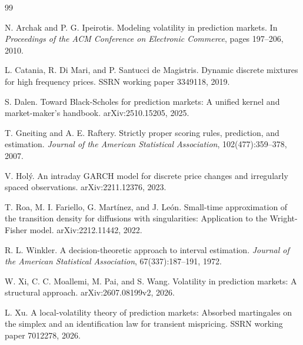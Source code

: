 \documentclass[11pt]{article}
\newcommand{\1}{\mathbb I}
\begin{document}
\begin{thebibliography}{99}

N. Archak and P. G. Ipeirotis.
Modeling volatility in prediction markets.
In \emph{Proceedings of the ACM Conference on Electronic Commerce}, pages 197--206, 2010.

L. Catania, R. Di Mari, and P. Santucci de Magistris.
Dynamic discrete mixtures for high frequency prices.
SSRN working paper 3349118, 2019.

S. Dalen.
Toward Black-Scholes for prediction markets: A unified kernel and market-maker's handbook.
arXiv:2510.15205, 2025.

T. Gneiting and A. E. Raftery.
Strictly proper scoring rules, prediction, and estimation.
\emph{Journal of the American Statistical Association}, 102(477):359--378, 2007.

V. Hol\'y.
An intraday GARCH model for discrete price changes and irregularly spaced observations.
arXiv:2211.12376, 2023.

T. Roa, M. I. Fariello, G. Mart\'inez, and J. Le\'on.
Small-time approximation of the transition density for diffusions with singularities: Application to the Wright-Fisher model.
arXiv:2212.11442, 2022.

R. L. Winkler.
A decision-theoretic approach to interval estimation.
\emph{Journal of the American Statistical Association}, 67(337):187--191, 1972.

W. Xi, C. C. Moallemi, M. Pai, and S. Wang.
Volatility in prediction markets: A structural approach.
arXiv:2607.08199v2, 2026.

L. Xu.
A local-volatility theory of prediction markets: Absorbed martingales on the simplex and an identification law for transient mispricing.
SSRN working paper 7012278, 2026.

\end{thebibliography}
\end{document}
